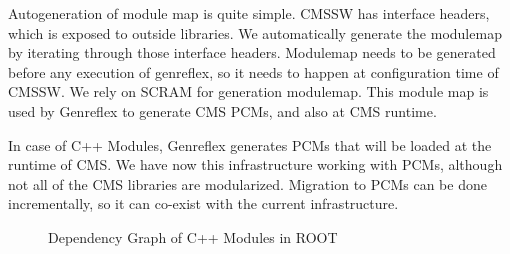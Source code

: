 \documentclass[12pt]{iopart}
\begin{document}
Autogeneration of module map is quite simple. CMSSW has interface headers, which is exposed to outside libraries. We automatically generate the modulemap by iterating through those interface headers. Modulemap needs to be generated before any execution of genreflex, so it needs to happen at configuration time of CMSSW.
We rely on SCRAM for generation modulemap. This module map is used by Genreflex to generate CMS PCMs, and also at CMS runtime.

In case of C++ Modules, Genreflex generates PCMs that will be loaded at the runtime of CMS. We have now this infrastructure working with PCMs, although not all of the CMS libraries are modularized. Migration to PCMs can be done incrementally, so it can co-exist with the current infrastructure.


\begin{figure}[!h]
  \centering
  \caption{Dependency Graph of C++ Modules in ROOT}
  \label{fig:pchandpcm}
\end{figure}



% 
\end{document}
